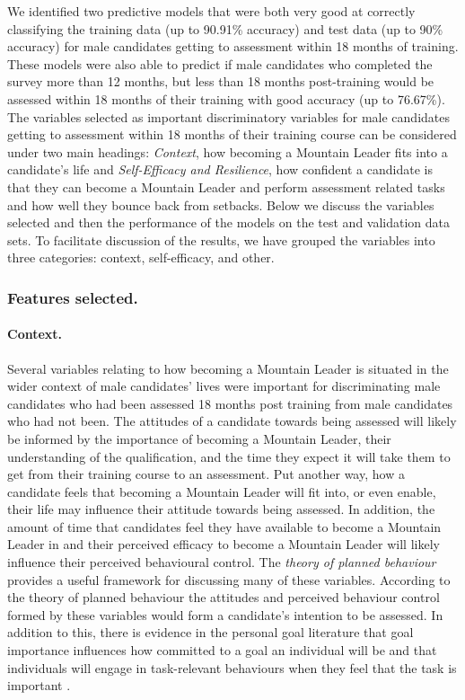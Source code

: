 \documentclass[
  12pt,
  a4paper,
]{book}
\begin{document}
We identified two predictive models that were both very good at correctly classifying the training data (up to 90.91\% accuracy) and test data (up to 90\% accuracy) for male candidates getting to assessment within 18 months of training. These models were also able to predict if male candidates who completed the survey more than 12 months, but less than 18 months post-training would be assessed within 18 months of their training with good accuracy (up to 76.67\%). The variables selected as important discriminatory variables for male candidates getting to assessment within 18 months of their training course can be considered under two main headings: \emph{Context}, how becoming a Mountain Leader fits into a candidate's life and \emph{Self-Efficacy and Resilience}, how confident a candidate is that they can become a Mountain Leader and perform assessment related tasks and how well they bounce back from setbacks. Below we discuss the variables selected and then the performance of the models on the test and validation data sets. To facilitate discussion of the results, we have grouped the variables into three categories: context, self-efficacy, and other.

\hypertarget{features-selected.}{%
\subsubsection{Features selected.}\label{features-selected.}}

\hypertarget{context}{%
\paragraph{Context.}\label{context}}

Several variables relating to how becoming a Mountain Leader is situated in the wider context of male candidates' lives were important for discriminating male candidates who had been assessed 18 months post training from male candidates who had not been. The attitudes of a candidate towards being assessed will likely be informed by the importance of becoming a Mountain Leader, their understanding of the qualification, and the time they expect it will take them to get from their training course to an assessment. Put another way, how a candidate feels that becoming a Mountain Leader will fit into, or even enable, their life may influence their attitude towards being assessed. In addition, the amount of time that candidates feel they have available to become a Mountain Leader in and their perceived efficacy to become a Mountain Leader will likely influence their perceived behavioural control. The \emph{theory of planned behaviour} \citep{Ajzen1991, Ajzen1986} provides a useful framework for discussing many of these variables. According to the theory of planned behaviour the attitudes and perceived behaviour control formed by these variables would form a candidate's intention to be assessed. In addition to this, there is evidence in the personal goal literature that goal importance influences how committed to a goal an individual will be \citep{Gollwitzer1993} and that individuals will engage in task-relevant behaviours when they feel that the task is important \citep[e.g.,][]{Ingledew2005, Yukl1999, Yukl1996}.
\end{document}
